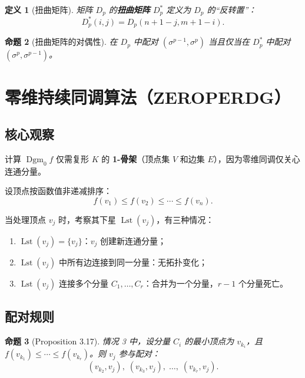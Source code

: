 \documentclass[UTF8]{ctexart}
\newtheorem{definition}{定义}[section]
\newtheorem{proposition}[definition]{命题}
\begin{document}
\begin{definition}[扭曲矩阵]
\label{def:twisted}
矩阵 \(D_p\) 的\textbf{扭曲矩阵} \(D_p^*\) 定义为 \(D_p\) 的“反转置”：
\[
D_p^*(i, j) = D_p(n + 1 - j, m + 1 - i).
\]
\end{definition}

\begin{proposition}[扭曲矩阵的对偶性]
\label{prop:twisted-duality}
在 \(D_p\) 中配对 \((\sigma^{p-1}, \sigma^p)\) 当且仅当在 \(D_p^*\) 中配对 \((\sigma^p, \sigma^{p-1})\)。
\end{proposition}

\section{零维持续同调算法（ZEROPERDG）}
\label{sec:zeroperdg}

\subsection{核心观察}

计算 \(\operatorname{Dgm}_0 f\) 仅需复形 \(K\) 的 \textbf{1-骨架}（顶点集 \(V\) 和边集 \(E\)），因为零维同调仅关心连通分量。

设顶点按函数值非递减排序：
\[
f(v_1) \le f(v_2) \le \cdots \le f(v_n).
\]

当处理顶点 \(v_j\) 时，考察其下星 \(\operatorname{Lst}(v_j)\)，有三种情况：

\begin{enumerate}
    \item \(\operatorname{Lst}(v_j) = \{v_j\}\)：\(v_j\) 创建新连通分量；
    \item \(\operatorname{Lst}(v_j)\) 中所有边连接到同一分量：无拓扑变化；
    \item \(\operatorname{Lst}(v_j)\) 连接多个分量 \(C_1, \dots, C_r\)：合并为一个分量，\(r-1\) 个分量死亡。
\end{enumerate}

\subsection{配对规则}

\begin{proposition}[Proposition 3.17]
\label{prop:zerod-merge}
情况 3 中，设分量 \(C_i\) 的最小顶点为 \(v_{k_i}\)，且 \(f(v_{k_1}) \le \cdots \le f(v_{k_r})\)。则 \(v_j\) 参与配对：
\[
(v_{k_2}, v_j),\; (v_{k_3}, v_j),\; \dots,\; (v_{k_r}, v_j).
\]
\end{proposition}
\end{document}
